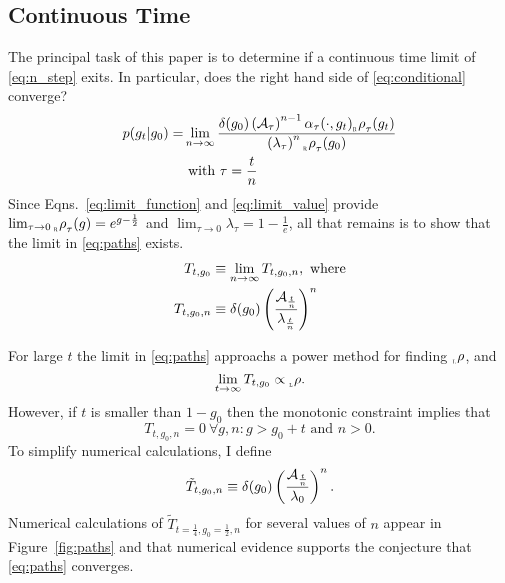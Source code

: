 \documentclass[12pt]{article} \usepackage{amsmath,amsfonts}
\newcommand{\Aop}{{\cal A}}
\newcommand{\Aindicate}{\alpha}
\newcommand{\density}{p}
\newcommand{\rightfunction}{{_{_{\scalebox{.4}{R}}} \rho}}
\newcommand{\leftfunction}{{_{_{\scalebox{.4}{L}}} \rho}}
\begin{document}
\subsection{Continuous Time}
\label{sec:continuous_t}

The principal task of this paper is to determine if a continuous time
limit of \eqref{eq:n_step} exits.  In particular, does the right hand
side of \eqref{eq:conditional} converge?
\begin{align}
  \label{eq:conditional}
  \density(g_t|g_0) = &\lim_{n \rightarrow \infty}  \frac{\delta(g_0)
    \left( \Aop_\tau \right)^{n-1} \Aindicate_\tau(\cdot,g_t)
    \rightfunction_\tau(g_t)} { \left( \lambda_\tau \right)^n
    \rightfunction_\tau(g_0)} \\
  & \text{ with } \tau=\frac{t}{n} \nonumber
\end{align}
Since Eqns.~\eqref{eq:limit_function} and \eqref{eq:limit_value}
provide
$\lim_{\tau \rightarrow 0} \rightfunction_\tau(g) = e^{g-\frac{1}{2}}$
and $\lim_{\tau \rightarrow 0} \lambda_\tau = 1 - \frac{1}{e}$, all
that remains is to show that the limit in \eqref{eq:paths} exists.
\begin{align}
  \label{eq:paths}
  T_{t,g_0} & \equiv \lim_{n \rightarrow \infty} T_{t,g_0,n}, \text{
  where}\\
  T_{t,g_0,n} & \equiv \delta(g_0) \left( \frac{\Aop_{\frac{t}{n}}}
                {\lambda_{\frac{t}{n}}} \right)^n  \nonumber
\end{align}

For large $t$ the limit in \eqref{eq:paths} approachs a power method for
finding $\leftfunction$, and
\begin{equation*}
  \lim_{t \rightarrow \infty} T_{t,g_0} \propto \leftfunction.
\end{equation*}
However, if $t$ is smaller than $1 - g_0$ then the monotonic
constraint implies that
\begin{equation*}
  T_{t,g_0,n} = 0 ~\forall g,n: g > g_0 + t \text{ and } n > 0.
\end{equation*}
To simplify numerical calculations, I define
\begin{equation*}
  \tilde T_{t,g_0,n} \equiv \delta(g_0) \left( \frac{\Aop_{\frac{t}{n}}}
                {\lambda_0} \right)^n.
\end{equation*}
Numerical calculations of $\tilde T_{t=\frac{1}{4},g_0=\frac{1}{2},n}$
for several values of $n$ appear in Figure~\ref{fig:paths} and that
numerical evidence supports the conjecture that \eqref{eq:paths}
converges.
\begin{figure*}
  \centering
  \caption{These plots of $\tilde T_{t=\frac{1}{4},g_0=\frac{1}{2},n}$
    for several values of $n$, suggest that $\lim_{n \rightarrow
      \infty}$ exists.}
  \label{fig:paths}
\end{figure*}
\end{document}
